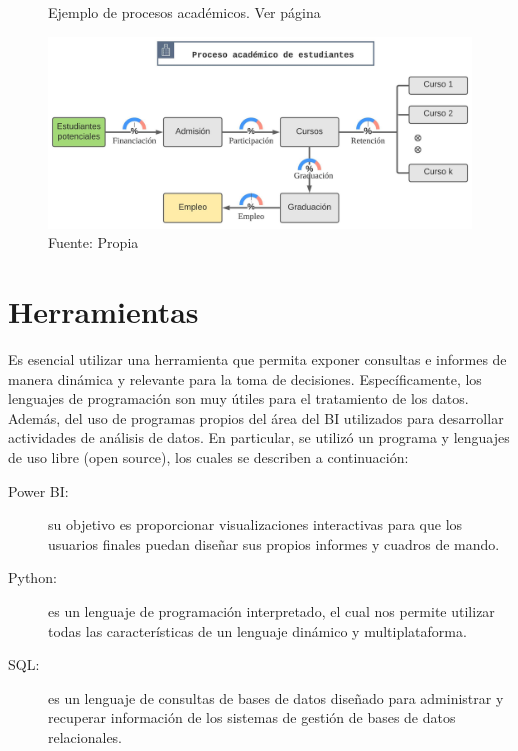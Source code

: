\documentclass[12pt,jou]{apa7}
\begin{document}
\begin{figure}[h]
\caption{Ejemplo de procesos académicos. Ver página \pageref{ProcesoU}}
\centering
\includegraphics[width=1\linewidth]{Figuras/ProcesoU}
\caption*{ Fuente: Propia}
\label{fig: ProcesoU}
\end{figure}


\section{Herramientas}
Es esencial utilizar una herramienta que permita exponer consultas e informes de manera dinámica y relevante para la toma de decisiones. Específicamente, los lenguajes de programación son muy útiles para el tratamiento de los datos. Además, del uso de programas propios del área del BI utilizados para desarrollar actividades de análisis de datos. En particular, se utilizó un programa y lenguajes de uso libre (open source), los cuales se describen a continuación:

\begin{description}
\item[Power BI: ] su objetivo es proporcionar visualizaciones interactivas para que los usuarios finales puedan diseñar sus propios informes y cuadros de mando. 
	
\item[Python: ] es un lenguaje de programación interpretado, el cual nos permite utilizar todas las características de un lenguaje dinámico y multiplataforma. 
	
\item[SQL: ] es un lenguaje de consultas de bases de datos diseñado para administrar y recuperar información de los sistemas de gestión de bases de datos relacionales. 
\end{description}
\end{document}
